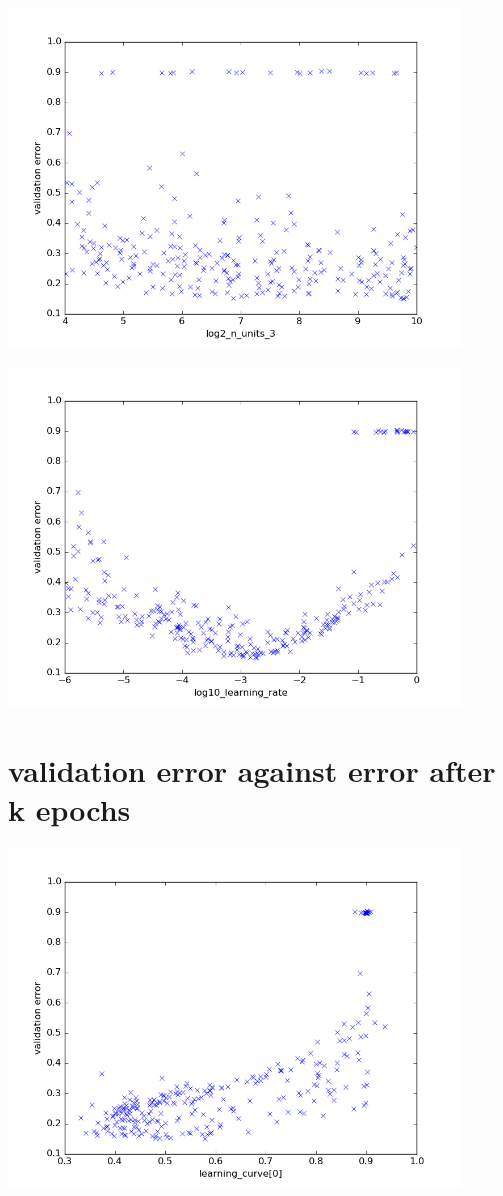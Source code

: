 \documentclass[a4paper,10pt]{article}
\begin{document}
\includegraphics[width=0.9\textwidth]{../../figures/log2_n_units_3}

\includegraphics[width=0.9\textwidth]{../../figures/log10_learning_rate}


\section{validation error against error after k epochs}

\includegraphics[width=0.9\textwidth]{../../figures/learning_curve0}
\end{document}
